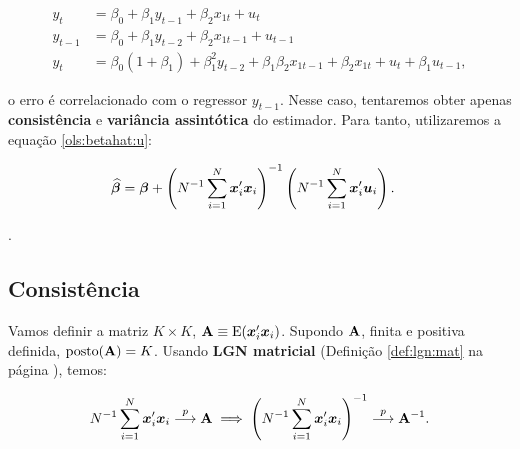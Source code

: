 \documentclass[11pt, oneside, a4paper, article]{article}
\numberwithin{equation}{section}
\begin{document}
\vspace{-1 em}
\begin{align*}
y_{t} &= \beta_{0} + \beta_{1} y_{t-1} + \beta_{2} x_{1t} + u_{t}
\\
y_{t-1} &= \beta_{0} + \beta_{1} y_{t-2} + \beta_{2} x_{1t-1} + u_{t-1}
\\
y_{t} &=
\beta_{0}(1 + \beta_{1})
+
\beta_{1}^2 y_{t-2}
+
\beta_{1} 
\beta_{2} x_{1t-1} 
+
\beta_{2} x_{1t} 
+
u_{t}
+
\beta_{1} u_{t-1},
\end{align*}

\noindent
o erro é correlacionado com o regressor $y_{t-1}$.
Nesse caso, tentaremos obter apenas \textbf{consistência} e \textbf{variância assintótica} do estimador.
Para tanto, utilizaremos a equação \eqref{ols:betahat:u}: 

\vspace{-1 em}
\begin{align*}
\widehat{\boldsymbol{\beta}} &= 
\boldsymbol{\beta} +
\left( N^{-1} \sum_{i=1}^{N} \boldsymbol{x}_{i}' \boldsymbol{x}_{i} \right)^{-1}
\left( N^{-1} \sum_{i=1}^{N} \boldsymbol{x}_{i}' \boldsymbol{u}_{i} \right).
\end{align*}

\vspace{1 em}
\begin{center}
	\Large{.}
\end{center}
\vspace{1 em}

\subsection{Consistência}
Vamos definir a matriz $K \times K$, $\mathbf{A} \equiv \text{E}(\boldsymbol{x}_{i}' \boldsymbol{x}_{i})$.
Supondo $\mathbf{A}$, finita e positiva definida, $\text{posto}(\mathbf{A}) = K$.
Usando \textbf{LGN matricial} (Definição \ref{def:lgn:mat} na página \pageref{def:lgn:mat}), temos: 

\noindent
{}

\vspace{-1 em}
\begin{align} \label{eq:Amat}
N^{-1} \sum_{i=1}^{N} \boldsymbol{x}_{i}' \boldsymbol{x}_{i}
 \overset{p}{\longrightarrow}  \mathbf{A}
\implies
\left( N^{-1} \sum_{i=1}^{N} \boldsymbol{x}_{i}' \boldsymbol{x}_{i} \right)^{-1}
 \overset{p}{\longrightarrow}  \mathbf{A}^{-1}.
\end{align}
\end{document}
